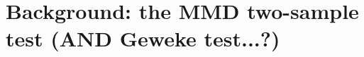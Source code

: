 \documentclass{article}
\begin{document}


\section{Background: the MMD two-sample test (AND Geweke test...?)} 
\end{document}
